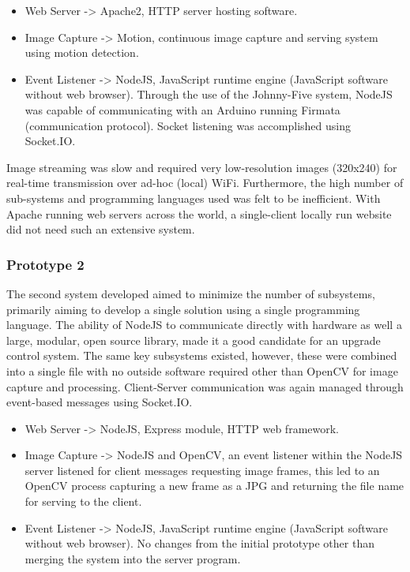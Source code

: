 \documentclass[11pt]{article} %
\begin{document}
\begin{itemize}
\item Web Server -> Apache2, HTTP server hosting software.
\item Image Capture -> Motion, continuous image capture and serving system using motion detection.
\item Event Listener -> NodeJS, JavaScript runtime engine (JavaScript software without web browser). Through the use of the Johnny-Five system, NodeJS was capable of communicating with an Arduino running Firmata (communication protocol). Socket listening was accomplished using Socket.IO.
\end{itemize}

Image streaming was slow and required very low-resolution images (320x240) for real-time transmission over ad-hoc (local) WiFi. Furthermore, the high number of sub-systems and programming languages used was felt to be inefficient. With Apache running web servers across the world, a single-client locally run website did not need such an extensive system.

\subsubsection{Prototype 2}
The second system developed aimed to minimize the number of subsystems, primarily aiming to develop a single solution using a single programming language. The ability of NodeJS to communicate directly with hardware as well a large, modular, open source library, made it a good candidate for an upgrade control system. The same key subsystems existed, however, these were combined into a single file with no outside software required other than OpenCV for image capture and processing. Client-Server communication was again managed through event-based messages using Socket.IO.

\begin{itemize}
\item Web Server -> NodeJS, Express module, HTTP web framework.
\item Image Capture -> NodeJS and OpenCV, an event listener within the NodeJS server listened for client messages requesting image frames, this led to an OpenCV process capturing a new frame as a JPG and returning the file name for serving to the client.
\item Event Listener -> NodeJS, JavaScript runtime engine (JavaScript software without web browser). No changes from the initial prototype other than merging the system into the server program.
\end{itemize}
\end{document}
